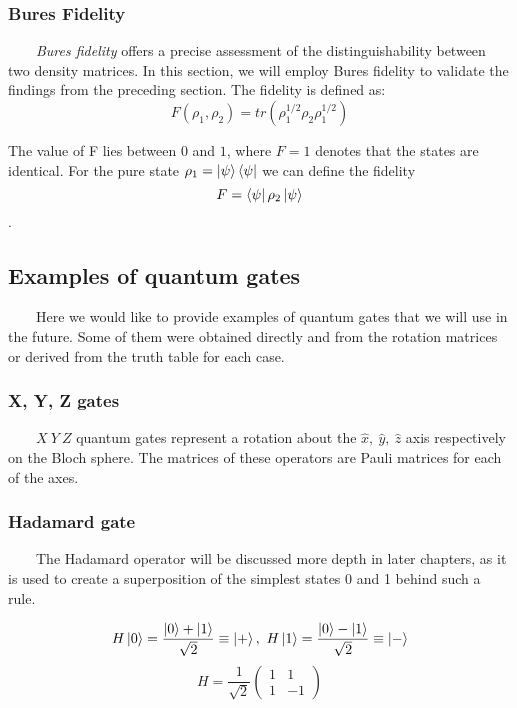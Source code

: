 \documentclass[english,14pt,a4paper]{article}
\begin{document}
	\subsubsection{Bures Fidelity} \ \ \ \
	\textit{Bures fidelity} offers a precise assessment of the distinguishability between two density matrices. In this section, we will employ Bures fidelity to validate the findings from the preceding section. The fidelity is defined as: 
	\begin{equation}
		F(\rho_1, \rho_2) = tr(\rho_1^{1/2}\rho_2\rho_1^{1/2})
	\end{equation}
	
	The value of F lies between $0$ and $1$, where $F = 1$ denotes that the states are identical. For the pure state $\rho_1 = \ket{\psi}\bra{\psi}$ we can define the fidelity \[F = \bra{\psi}\rho_2 \ket{\psi}\].
	
	\subsection{Examples of quantum gates} \ \ \ \ 
	Here we would like to provide examples of quantum gates that we will use in the future. Some of them were obtained directly and from the rotation matrices or derived from the truth table for each case. 
	
	\subsubsection{X, Y, Z gates}\ \ \ \
	\(X  \ Y \ Z\) quantum gates represent a rotation about the $\hat{x}, \ \hat{y}, \ \hat{z}$ axis respectively on the Bloch sphere. The matrices of these operators are Pauli matrices for each of the axes. 
	
	\subsubsection{Hadamard gate}\ \ \ \
	The Hadamard operator will be discussed more depth in later chapters, as it is used to create a superposition of the simplest states 0 and 1 behind such a rule. 
	
	\[
		H \ket{0} = \frac{\ket{0} + \ket{1}}{\sqrt{2}} \equiv \ket{+}, \ H \ket{1} = \frac{\ket{0} - \ket{1}}{\sqrt{2}} \equiv \ket{-}
	\]
	\begin{equation}
	H = \frac{1}{\sqrt{2}} \begin{pmatrix} 1 & 1 \\ 1 & -1 \end{pmatrix}
	\end{equation}
	
\end{document}
